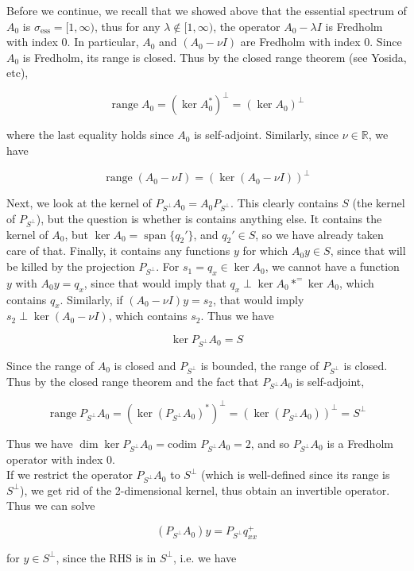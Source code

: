 \documentclass[12pt]{article}
\def\R{{\mathbb R}}
\DeclareMathOperator{\spn}{span}
\DeclareMathOperator{\ran}{range}
\begin{document}
\begin{enumerate}
Before we continue, we recall that we showed above that the essential spectrum of $A_0$ is $\sigma_{\text{ess}} = [1, \infty)$, thus for any $\lambda \notin [1, \infty)$, the operator $A_0 - \lambda I$ is Fredholm with index 0. In particular, $A_0$ and $(A_0 - \nu I)$ are Fredholm with index 0. Since $A_0$ is Fredholm, its range is closed. Thus by the closed range theorem (see Yosida, etc), 

\[
\ran A_0 = (\ker A_0^*)^\perp = (\ker A_0)^\perp
\]

where the last equality holds since $A_0$ is self-adjoint. Similarly, since $\nu \in \R$, we have

\[
\ran (A_0 - \nu I) = (\ker (A_0 - \nu I))^\perp 
\]

Next, we look at the kernel of $P_{S^\perp} A_0 = A_0 P_{S^\perp}$. This clearly contains $S$ (the kernel of $P_{S^\perp}$), but the question is whether is contains anything else. It contains the kernel of $A_0$, but $\ker A_0 = \spn\{ q_2' \}$, and $q_2' \in S$, so we have already taken care of that. Finally, it contains any functions $y$ for which $A_0 y \in S$, since that will be killed by the projection $P_{S^\perp}$. For $s_1 = q_x \in \ker A_0$, we cannot have a function $y$ with $A_0 y = q_x$, since that would imply that $q_x \perp \ker A_0*^ = \ker A_0$, which contains $q_x$. Similarly, if $(A_0 - \nu I)y = s_2$, that would imply $s_2 \perp \ker (A_0 - \nu I)$, which contains $s_2$. Thus we have

\[
\ker P_{S^\perp} A_0 = S 
\]

Since the range of $A_0$ is closed and $P_{S^\perp}$ is bounded, the range of $P_{S^\perp}$ is closed. Thus by the closed range theorem and the fact that $P_{S^\perp} A_0$ is self-adjoint,

\[
\ran P_{S^\perp} A_0 = (\ker (P_{S^\perp} A_0)^*)^\perp = (\ker (P_{S^\perp} A_0))^\perp = S^\perp
\]

Thus we have $\dim \ker P_{S^\perp} A_0 = \text{codim } P_{S^\perp} A_0 = 2$, and so $P_{S^\perp} A_0$ is a Fredholm operator with index 0.\\

If we restrict the operator $P_{S^\perp} A_0$ to $S^\perp$ (which is well-defined since its range is $S^\perp$), we get rid of the 2-dimensional kernel, thus obtain an invertible operator. Thus we can solve

\[
(P_{S^\perp} A_0) y = P_{S^\perp} q^+_{xx}
\]

for $y \in S^\perp$, since the RHS is in $S^\perp$, i.e. we have


\end{enumerate}
\end{document}
